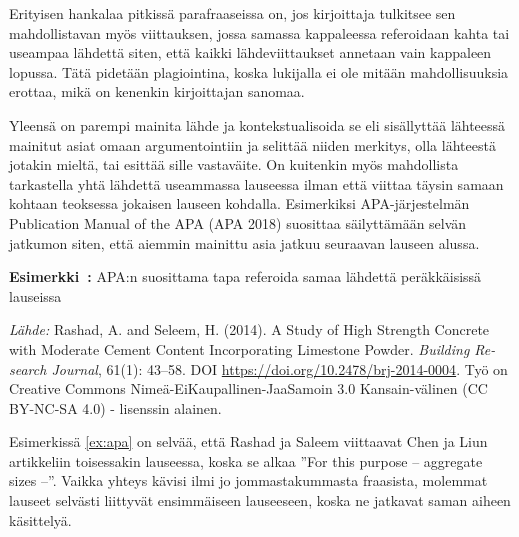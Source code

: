 \documentclass[finnish, 12pt, a4paper, elec, utf8, a-2b, online]{aaltothesis}
\begin{document}
Erityisen hankalaa pitkissä parafraaseissa on, jos kirjoittaja tulkitsee sen 
mahdollistavan myös viittauksen, jossa samassa kappaleessa referoidaan kahta tai
useampaa lähdettä siten, että kaikki lähdeviittaukset annetaan vain kappaleen 
lopussa. Tätä pidetään plagiointina, koska lukijalla ei ole mitään 
mahdollisuuksia erottaa, mikä on kenenkin kirjoittajan sanomaa.

Yleensä on parempi mainita lähde ja kontekstualisoida se eli sisällyttää 
lähteessä mainitut asiat omaan argumentointiin ja selittää niiden merkitys, olla 
lähteestä jotakin mieltä, tai esittää sille vastaväite. On kuitenkin myös 
mahdollista tarkastella yhtä lähdettä useammassa lauseessa ilman että viittaa 
täysin samaan kohtaan teoksessa jokaisen lauseen kohdalla. Esimerkiksi 
APA-järjestelmän Publication Manual of the APA (APA 2018) suosittaa säilyttämään
selvän jatkumon siten, että aiemmin mainittu asia jatkuu seuraavan lauseen 
alussa.

\vspace{1em}
\noindent
{}
\textsf{\textbf{Esimerkki~\theexample:}} \label{ex:apa}APA:n suosittama tapa 
referoida samaa lähdettä peräkkäisissä lauseissa 

\vspace{1ex}
\noindent
{}

\vspace{1ex}
\noindent
\textit{Lähde:} Rashad, A. and Seleem, H. (2014). A Study of High Strength 
Concrete with Moderate Cement Content Incorporating Limestone Powder. 
\textit{Building Re-search Journal}, 61(1): 43--58. 
DOI \url{https://doi.org/10.2478/brj-2014-0004}. 
Työ on Creative Commons Nimeä-EiKaupallinen-JaaSamoin 3.0 Kansain-välinen (CC 
BY-NC-SA 4.0) - lisenssin alainen.

\vspace{1em}
Esimerkissä \ref{ex:apa} on selvää, että Rashad ja Saleem viittaavat Chen ja 
Liun artikkeliin toisessakin lauseessa, koska se alkaa ”For this purpose -- 
aggregate sizes --”. Vaikka yhteys kävisi ilmi jo jommastakummasta fraasista, 
molemmat lauseet selvästi liittyvät ensimmäiseen lauseeseen, koska ne jatkavat 
saman aiheen käsittelyä.
\end{document}
